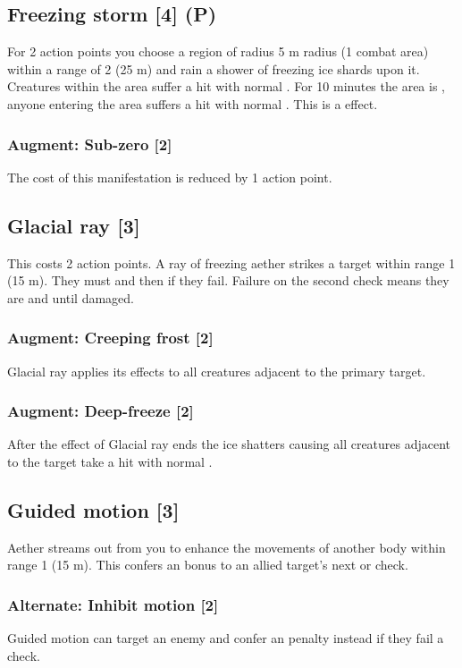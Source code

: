\subsection{Freezing storm [4] (P)}
For 2 action points you choose a region of radius 5 m radius (1 combat area) within a range of 2 (25 m) and rain a shower of freezing ice shards upon it. Creatures within the area suffer a hit with normal . For 10 minutes the area is , anyone entering the area suffers a hit with normal . This is a  effect.
\subsubsection{Augment: Sub-zero [2]}
The cost of this manifestation is reduced by 1 action point.


\subsection{Glacial ray [3]}
This costs 2 action points. A ray of freezing aether strikes a target within range 1 (15 m). They must  and then  if they fail. Failure on the second check means they are  and  until damaged. 
\subsubsection{Augment: Creeping frost [2]}
Glacial ray applies its effects to all creatures adjacent to the primary target.
\subsubsection{Augment: Deep-freeze [2]}
After the effect of Glacial ray ends the ice shatters causing all creatures adjacent to the target take a hit with normal .


\subsection{Guided motion [3]}
Aether streams out from you to enhance the movements of another body within range 1 (15 m). This confers an  bonus to an allied target's next  or  check.
\subsubsection{Alternate: Inhibit motion [2]}
Guided motion can target an enemy and confer an  penalty instead if they fail a  check.


